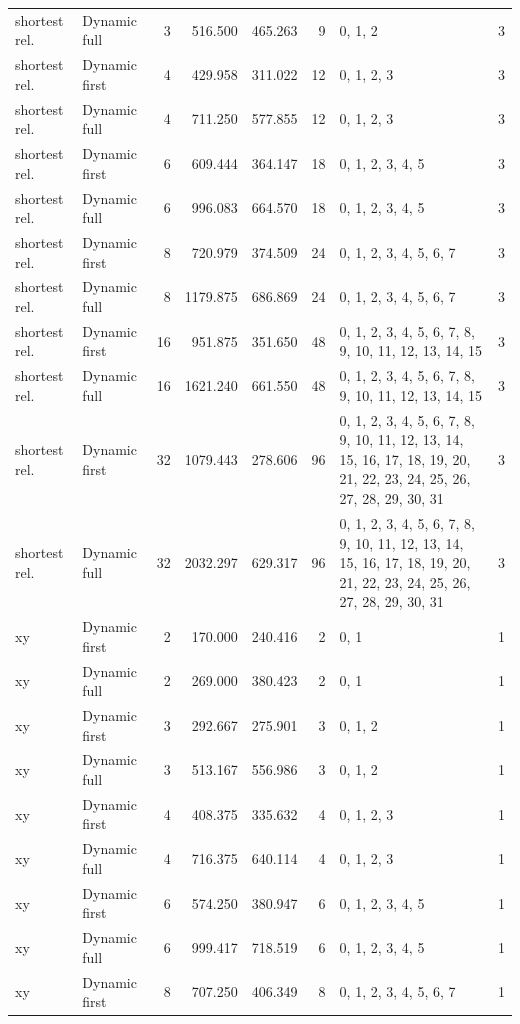 \documentclass[10pt,a4paper]{article}
\begin{document}
\begin{longtable}{@{}p{23mm}p{29mm}rrrrp{36mm}r@{}}
shortest rel. & Dynamic full & 3 & 516.500 & 465.263 & 9 & 0, 1, 2 & 3 \\
shortest rel. & Dynamic first & 4 & 429.958 & 311.022 & 12 & 0, 1, 2, 3 & 3 \\
shortest rel. & Dynamic full & 4 & 711.250 & 577.855 & 12 & 0, 1, 2, 3 & 3 \\
shortest rel. & Dynamic first & 6 & 609.444 & 364.147 & 18 & 0, 1, 2, 3, 4, 5 & 3 \\
shortest rel. & Dynamic full & 6 & 996.083 & 664.570 & 18 & 0, 1, 2, 3, 4, 5 & 3 \\
shortest rel. & Dynamic first & 8 & 720.979 & 374.509 & 24 & 0, 1, 2, 3, 4, 5, 6, 7 & 3 \\
shortest rel. & Dynamic full & 8 & 1179.875 & 686.869 & 24 & 0, 1, 2, 3, 4, 5, 6, 7 & 3 \\
shortest rel. & Dynamic first & 16 & 951.875 & 351.650 & 48 & 0, 1, 2, 3, 4, 5, 6, 7, 8, 9, 10, 11, 12, 13, 14, 15 & 3 \\
shortest rel. & Dynamic full & 16 & 1621.240 & 661.550 & 48 & 0, 1, 2, 3, 4, 5, 6, 7, 8, 9, 10, 11, 12, 13, 14, 15 & 3 \\
shortest rel. & Dynamic first & 32 & 1079.443 & 278.606 & 96 & 0, 1, 2, 3, 4, 5, 6, 7, 8, 9, 10, 11, 12, 13, 14, 15, 16, 17, 18, 19, 20, 21, 22, 23, 24, 25, 26, 27, 28, 29, 30, 31 & 3 \\
shortest rel. & Dynamic full & 32 & 2032.297 & 629.317 & 96 & 0, 1, 2, 3, 4, 5, 6, 7, 8, 9, 10, 11, 12, 13, 14, 15, 16, 17, 18, 19, 20, 21, 22, 23, 24, 25, 26, 27, 28, 29, 30, 31 & 3 \\
xy & Dynamic first & 2 & 170.000 & 240.416 & 2 & 0, 1 & 1 \\
xy & Dynamic full & 2 & 269.000 & 380.423 & 2 & 0, 1 & 1 \\
xy & Dynamic first & 3 & 292.667 & 275.901 & 3 & 0, 1, 2 & 1 \\
xy & Dynamic full & 3 & 513.167 & 556.986 & 3 & 0, 1, 2 & 1 \\
xy & Dynamic first & 4 & 408.375 & 335.632 & 4 & 0, 1, 2, 3 & 1 \\
xy & Dynamic full & 4 & 716.375 & 640.114 & 4 & 0, 1, 2, 3 & 1 \\
xy & Dynamic first & 6 & 574.250 & 380.947 & 6 & 0, 1, 2, 3, 4, 5 & 1 \\
xy & Dynamic full & 6 & 999.417 & 718.519 & 6 & 0, 1, 2, 3, 4, 5 & 1 \\
xy & Dynamic first & 8 & 707.250 & 406.349 & 8 & 0, 1, 2, 3, 4, 5, 6, 7 & 1 \\

\end{longtable}
\end{document}
